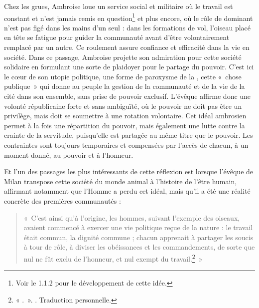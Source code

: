 Chez les grues, Ambroise loue un service social et militaire où le travail est constant et n'est jamais remis en question\footnote{Voir le 1.1.2 pour le développement de cette idée.} et plus encore, où le rôle de dominant n'est pas figé dans les mains d'un seul : dans les formations de vol, l'oiseau placé en tête se fatigue pour guider la communauté avant d'être volontairement remplacé par un autre. Ce roulement assure confiance et efficacité dans la vie en société. Dans ce passage, Ambroise projette son admiration pour cette société solidaire en formulant une sorte de plaidoyer pour le partage du pouvoir. C'est ici le cœur de son utopie politique, une forme de paroxysme de la , cette «~chose publique~» qui donne au peuple la gestion de la communauté et de la vie de la cité dans son ensemble, sans prise de pouvoir exclusif. L'évêque affirme donc une volonté républicaine forte et sans ambiguïté, où le pouvoir ne doit pas être un privilège, mais doit se soumettre à une rotation volontaire. Cet idéal ambrosien permet à la fois une répartition du pouvoir, mais également une lutte contre la crainte de la servitude, puisqu'elle est partagée au même titre que le pouvoir. Les contraintes sont toujours temporaires et compensées par l'accès de chacun, à un moment donné, au pouvoir et à l'honneur.

\bigskip

Et l'un des passages les plus intéressants de cette réflexion est lorsque l'évêque de Milan transpose cette société du monde animal à l'histoire de l'être humain, affirmant notamment que l'Homme a perdu cet idéal, mais qu'il a été une réalité concrète des premières communautés :

\bigskip

\begin{quote}
    «~C’est ainsi qu’à l’origine, les hommes, suivant l’exemple des oiseaux, avaient commencé à exercer une vie politique reçue de la nature : le travail était commun, la dignité commune ; chacun apprenait à partager les soucis à tour de rôle, à diviser les obéissances et les commandements, de sorte que nul ne fût exclu de l'honneur, et nul exempt du travail.\footnote{« .~». \cite[\nopp V, 15, 52]{ambroise_csel_32_1}. Traduction personnelle.}~»
\end{quote}

